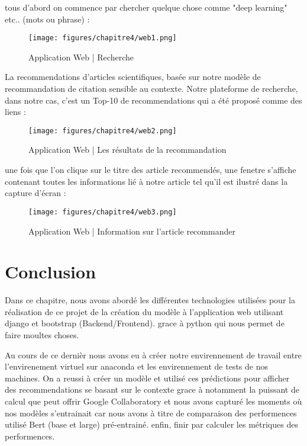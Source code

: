 \par tous d'abord on commence par chercher quelque chose comme "deep learning" etc.. (mots ou phrase) : 

\begin{figure}[H]
	\begin{center}
		\texttt{[image: figures/chapitre4/web1.png]}
	\end{center}
	\caption {Application Web | Recherche }
	\label{fig:web1}
\end{figure}  

\par La recommendations d'articles scientifiques, basée sur notre modèle de recommandation de citation sensible au contexte. Notre plateforme de recherche, dans notre cas, c'est un Top-10 de recommendations qui a été proposé comme des liens : 

\begin{figure}[H]
	\begin{center}
		\texttt{[image: figures/chapitre4/web2.png]}
	\end{center}
	\caption {Application Web | Les résultats de la recommandation }
	\label{fig:web2}
\end{figure}

\par une fois que l'on clique sur le titre des article recommendés, une fenetre s'affiche contenant toutes les informations lié à notre article tel qu'il est ilustré dans la capture d'écran : 

\begin{figure}[H]
	\begin{center}
		\texttt{[image: figures/chapitre4/web3.png]}
	\end{center}
	\caption {Application Web | Information sur l'article recommander  }
	\label{fig:web3}
\end{figure}  

\section{Conclusion}
\par Dans ce chapitre, nous avons abordé les différentes technologies utilisées pour la réalisation de ce projet de la création du modèle à l'application web utilisant django et bootstrap (Backend/Frontend). grace à python qui nous permet de faire moultes choses.

\par Au cours de ce dernièr nous avons eu à créer notre envirennement de travail entre l'envirenement virtuel sur anaconda et les envirennement de tests de nos machines. On a reussi à créer un modèle et utilisé ces prédictions pour afficher des recommendations se basant sur le contexte grace à notamment la puissant de calcul que peut offrir Google Collaboratory\cite{ggcolabjptr} et nous avons capturé les moments où nos modèles s'entrainait car nous avons à titre de comparaison des performences utilisé Bert (base et large) pré-entrainé. enfin, finir par calculer les métriques des performences.

